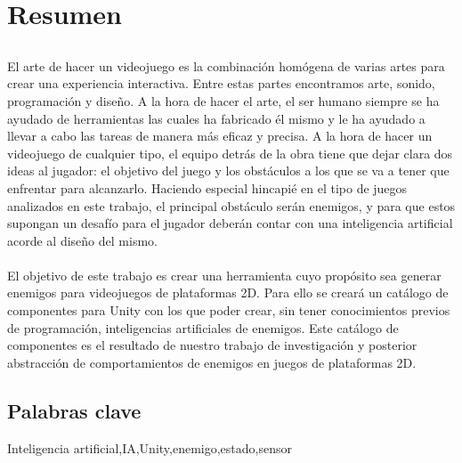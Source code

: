 \chapter*{Resumen}

\section*{\tituloPortadaVal}

El arte de hacer un videojuego es la combinación homógena de varias artes para crear una experiencia interactiva. Entre estas partes encontramos arte, sonido, programación y diseño. A la hora de hacer el arte, el ser humano siempre se ha ayudado de herramientas las cuales ha fabricado él mismo y le ha ayudado a llevar a cabo las tareas de manera más eficaz y precisa.
A la hora de hacer un videojuego de cualquier tipo, el equipo detrás de la obra tiene que dejar clara dos ideas al jugador: el objetivo del juego y los obstáculos a los que se va a tener que enfrentar para alcanzarlo. Haciendo especial hincapié en el tipo de juegos analizados en este trabajo, el principal obstáculo serán enemigos, y para que estos supongan un desafío para el jugador deberán contar con una inteligencia artificial acorde al diseño del mismo.\\\\ 

El objetivo de este trabajo es crear una herramienta cuyo propósito sea generar enemigos para videojuegos de plataformas 2D. Para ello se creará un catálogo de componentes para Unity con los que poder crear, sin tener conocimientos previos de programación, inteligencias artificiales de enemigos. Este catálogo de componentes es el resultado de nuestro trabajo de investigación y posterior abstracción de comportamientos de enemigos en juegos de plataformas 2D. 
\section*{Palabras clave}
   
\noindent Inteligencia artificial,IA,Unity,enemigo,estado,sensor

   



